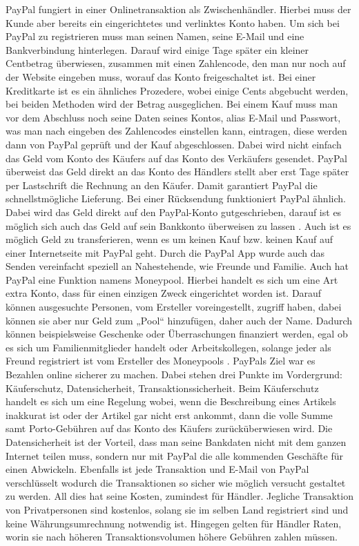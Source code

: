PayPal fungiert in einer Onlinetransaktion als Zwischenhändler. Hierbei muss der Kunde aber bereits ein eingerichtetes und verlinktes Konto haben. Um sich bei PayPal zu registrieren muss man seinen Namen, seine E-Mail und eine Bankverbindung hinterlegen. Darauf wird einige Tage später ein kleiner Centbetrag überwiesen, zusammen mit einen Zahlencode, den man nur noch auf der Website eingeben muss, worauf das Konto freigeschaltet ist. Bei einer Kreditkarte ist es ein ähnliches Prozedere, wobei einige Cents abgebucht werden, bei beiden Methoden wird der Betrag ausgeglichen. Bei einem Kauf muss man vor dem Abschluss noch seine Daten seines Kontos, alias E-Mail und Passwort, was man nach eingeben des Zahlencodes einstellen kann, eintragen, diese werden dann von PayPal geprüft und der Kauf abgeschlossen. Dabei wird nicht einfach das Geld vom Konto des Käufers auf das Konto des Verkäufers gesendet. PayPal überweist das Geld direkt an das Konto des Händlers stellt aber erst Tage später per Lastschrift die Rechnung an den Käufer. Damit garantiert PayPal die schnellstmögliche Lieferung. Bei einer Rücksendung funktioniert PayPal ähnlich. Dabei wird das Geld direkt auf den PayPal-Konto gutgeschrieben, darauf ist es möglich sich auch das Geld auf sein Bankkonto überweisen zu lassen \cite{schulz}. Auch ist es möglich Geld zu transferieren, wenn es um keinen Kauf bzw. keinen Kauf auf einer Internetseite mit PayPal geht. Durch die PayPal App wurde auch das Senden vereinfacht speziell an Nahestehende, wie Freunde und Familie. Auch hat PayPal eine Funktion namens Moneypool. Hierbei handelt es sich um eine Art extra Konto, dass für einen einzigen Zweck eingerichtet worden ist. Darauf können ausgesuchte Personen, vom Ersteller voreingestellt, zugriff haben, dabei können sie aber nur Geld zum „Pool“ hinzufügen, daher auch der Name. Dadurch können beispielsweise Geschenke oder Überraschungen finanziert werden, egal ob es sich um Familienmitglieder handelt oder Arbeitskollegen, solange jeder als Freund registriert ist vom Ersteller des Moneypools \cite{PayPal}. PayPals Ziel war es Bezahlen online sicherer zu machen. Dabei stehen drei Punkte im Vordergrund: Käuferschutz, Datensicherheit, Transaktionssicherheit. Beim Käuferschutz handelt es sich um eine Regelung wobei, wenn die Beschreibung eines Artikels inakkurat ist oder der Artikel gar nicht erst ankommt, dann die volle Summe samt Porto-Gebühren auf das Konto des Käufers zurücküberwiesen wird. Die Datensicherheit ist der Vorteil, dass man seine Bankdaten nicht mit dem ganzen Internet teilen muss, sondern nur mit PayPal die alle kommenden Geschäfte für einen Abwickeln. Ebenfalls ist jede Transaktion und E-Mail von PayPal verschlüsselt wodurch die Transaktionen so sicher wie möglich versucht gestaltet zu werden. All dies hat seine Kosten, zumindest für Händler. Jegliche Transaktion von Privatpersonen sind kostenlos, solang sie im selben Land registriert sind und keine Währungsumrechnung notwendig ist. Hingegen gelten für Händler Raten, worin sie nach höheren Transaktionsvolumen höhere Gebühren zahlen müssen.

